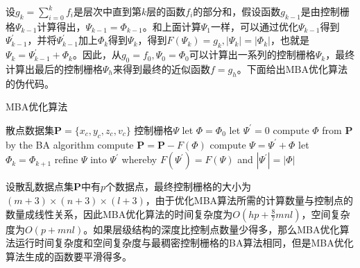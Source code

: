 设$ g_{k} = \sum_{i=0}^{k} f_{i} $是层次中直到第$ k $层的函数$ f_{i} $的部分和，假设函数$ g_{k-1} $是由控制栅格$ \Psi_{k-1} $计算得出，$ \Psi_{k-1} = \Phi_{k-1} $。和上面计算$ \Psi_{1} $一样，可以通过优化$ \Psi_{k-1} $得到$ \Psi_{k-1}^{'} $，并将$ \Psi_{k-1}^{'} $加上$ \Phi_{k} $得到$ \Psi_{k} $，得到$ F\left( \Psi_{k} \right) = g_{k} , | \Psi_{k} | = | \Phi_{k} | $，也就是$ \Psi_{k} = \Psi_{k-1}^{'} + \Phi_{k} $。因此，从$ g_{0} = f_{0} , \Psi_{0} = \Phi_{0} $可以计算出一系列的控制栅格$ \Psi_{k} $，最终计算出最后的控制栅格$ \Psi_{h} $来得到最终的近似函数$ f = g_{h} $。下面给出MBA优化算法的伪代码。

\begin{algorithm}
    \caption{MBA优化算法}
    \begin{algorithmic}[1] %
        \Require 散点数据集$ \mathbf{P} = \{ x_{c}, y_{c}, z_{c}, v_{c} \} $
        \Ensure 控制栅格$ \Psi $
        \State let $ \Phi = \Phi_{0} $
        \State let $ \Psi^{'} = 0 $
        \State compute $ \Phi $ from $ \mathbf{P} $ by the BA algorithm
        \State compute $ \mathbf{P} = \mathbf{P} - F\left( \Phi \right) $
        \State compute $ \Psi = \Psi^{'} + \Phi $
        \State let $ \Phi_{k} = \Phi_{k+1} $
        \State refine $ \Psi $ into $ \Psi^{'} $ whereby $ F\left( \Psi^{'} \right) = F\left( \Psi \right) $ and $ | \Psi^{'} | = | \Phi | $
        \EndWhile
    \end{algorithmic}
\end{algorithm}

设散乱数据点集$ \mathbf{P} $中有$ p $个数据点，最终控制栅格的大小为$ \left( m+3 \right) \times \left( n+3 \right) \times \left( l+3 \right) $，由于优化MBA算法所需的计算数量与控制点的数量成线性关系，因此MBA优化算法的时间复杂度为$ O\left( hp+\frac{8}{7}mnl \right) $，空间复杂度为$ O\left( p+mnl \right) $。如果层级结构的深度比控制点数量少得多，那么MBA优化算法运行时间复杂度和空间复杂度与最稠密控制栅格的BA算法相同，但是MBA优化算法生成的函数要平滑得多。